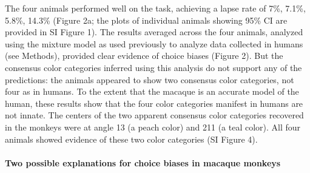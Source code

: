 The four animals performed well on the task, achieving a lapse rate of 7\%, 7.1\%, 5.8\%, 14.3\% (Figure 2a; the plots of individual animals showing 95\% CI are provided in SI Figure 1). The results averaged across the four animals, analyzed using the mixture model as used previously to analyze data collected in humans \citep{bae_why_2015,zhang_discrete_2008} (see Methods), provided clear evidence of choice biases (Figure 2). But the consensus color categories inferred using this analysis do not support any of the predictions: the animals appeared to show two consensus color categories, not four as in humans. To the extent that the macaque is an accurate model of the human, these results show that the four color categories manifest in humans are not innate. The centers of the two apparent consensus color categories recovered in the monkeys were at angle 13 (a peach color) and 211 (a teal color). All four animals showed evidence of these two color categories (SI Figure 4).

\paragraph{Two possible explanations for choice biases in macaque monkeys}

